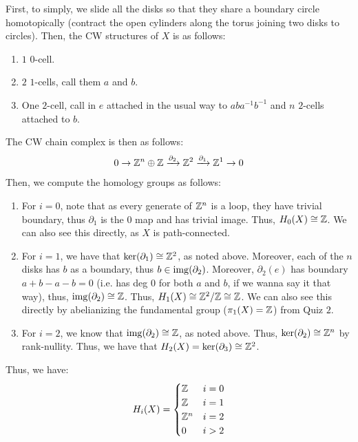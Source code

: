 \documentclass[12pt]{article}
\begin{document}
\begin{solution}
    First, to simply, we slide all the disks so that they share a boundary circle homotopically (contract the open cylinders along the torus joining two disks to circles). Then, the CW structures of $X$ is as follows: 
    \begin{enumerate}
        \item $1$ $0$-cell. 
        \item $2$ $1$-cells, call them $a$ and $b$. 
        \item One $2$-cell, call in $e$ attached in the usual way to $aba^{-1}b^{-1}$ and $n$ $2$-cells attached to $b$. 
    \end{enumerate}
    The CW chain complex is then as follows:
    \[ 0 \to \mathbb Z^n \oplus \mathbb Z \xrightarrow{\partial_2} \mathbb Z^2 \xrightarrow{\partial_1} \mathbb Z^1 \to 0\]
    Then, we compute the homology groups as follows: 
    \begin{enumerate}
        \item For $i = 0$, note that as every generate of $\mathbb Z^n$ is a loop, they have trivial boundary, thus $\partial_1$ is the $0$ map and has trivial image. Thus, $H_0(X) \cong \mathbb Z$. We can also see this directly, as $X$ is path-connected.
        \item For $i = 1$, we have that $\ker(\partial_1) \cong \mathbb Z^2$, as noted above. Moreover, each of the $n$ disks has $b$ as a boundary, thus $b \in \operatorname{img}(\partial_2)$. Moreover, $\partial_2(e)$ has boundary $a + b - a - b = 0$ (i.e. has deg $0$ for both $a$ and $b$, if we wanna say it that way), thus, $\operatorname{img}(\partial_2) \cong \mathbb Z$. Thus, $H_1(X) \cong \mathbb Z^2/\mathbb Z \cong \mathbb Z$. We can also see this directly by abelianizing the fundamental group ($\pi_1(X) = \mathbb Z$) from Quiz $2$.
        \item For $i = 2$, we know that $\operatorname{img}(\partial_2) \cong \mathbb Z$, as noted above. Thus, $\ker(\partial_2) \cong \mathbb Z^n$ by rank-nullity. Thus, we have that $H_2(X) = \ker(\partial_3) \cong \mathbb Z^2$.
    \end{enumerate}
    Thus, we have: 
    \[ H_i(X) = \begin{cases}
        \mathbb Z & i = 0 \\
        \mathbb Z & i = 1 \\
        \mathbb Z^n & i = 2 \\
        0 & i > 2
    \end{cases}\]
    

\end{solution}
\end{document}
